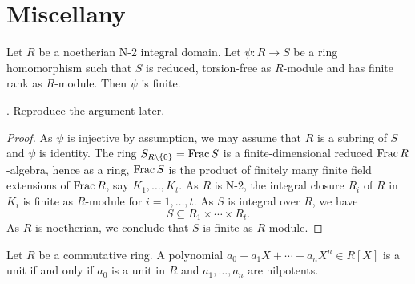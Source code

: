 \section{Miscellany}

\begin{proposition}\label{prop-noethjapfinite}
    Let $R$ be a noetherian N-2 integral domain. Let $\psi:R\rightarrow S$ be a ring homomorphism such that $S$ is reduced, torsion-free as $R$-module and has finite rank as $R$-module. Then $\psi$ is finite.
\end{proposition}
\cite[Page~122]{BGR}. Reproduce the argument later.
\begin{proof}
    As $\psi$ is injective by assumption, we may assume that $R$ is a subring of $S$ and $\psi$ is identity. The ring $S_{R\setminus\{0\}}=\operatorname{Frac} S$ is a finite-dimensional reduced $\operatorname{Frac} R$-algebra, hence as a ring, $\operatorname{Frac} S$ is the product of finitely many finite field extensions of $\operatorname{Frac} R$, say $K_1,\ldots,K_t$.  As $R$ is N-2, the integral closure $R_i$ of $R$ in $K_i$ is finite as $R$-module for $i=1,\ldots,t$. As $S$ is integral over $R$, we have
    \[
        S\subseteq R_1\times \cdots \times R_t.  
    \]
    As $R$ is noetherian, we conclude that $S$ is finite as $R$-module.
\end{proof}

\begin{lemma}
    Let $R$ be a commutative ring. A polynomial $a_0+a_1X+\cdots+a_nX^n\in R[X]$ is a unit if and only if $a_0$ is a unit in $R$ and $a_1,\ldots,a_n$ are nilpotents.
\end{lemma}

\printbibliography

